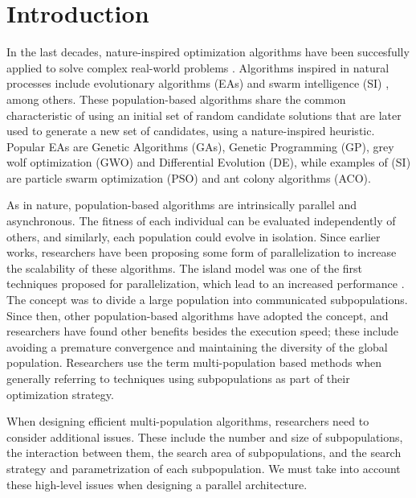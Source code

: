 \documentclass[review]{elsarticle}
\begin{document}
\linenumbers

\section{Introduction}

In the last decades, nature-inspired optimization algorithms have been succesfully
applied to solve complex real-world problems \cite{yang2014nature}. Algorithms
inspired in natural processes include evolutionary algorithms (EAs)
\cite{back1996evolutionary} and swarm intelligence (SI) \cite{kennedy2006swarm},
among others. These population-based algorithms share the common characteristic
of using an initial set of random candidate solutions that are later used to
generate a new set of candidates, using a nature-inspired heuristic. Popular EAs
are Genetic Algorithms (GAs), Genetic Programming (GP), grey wolf optimization
(GWO) and Differential Evolution (DE), while examples of (SI) are particle swarm
optimization (PSO) and ant colony algorithms (ACO).

As in nature, population-based algorithms are intrinsically parallel and
asynchronous. The fitness of each individual can be evaluated independently of
others, and similarly, each population could evolve in isolation. Since 
earlier works, researchers have been proposing some form of parallelization
\cite{muhlenbein1988evolution} to increase the scalability of these algorithms.
The island model was one of the first techniques proposed for parallelization,
which lead to an increased performance
\cite{gorges1990explicit,grosso1985computer}. The concept was to divide a large
population into communicated subpopulations. Since then, other population-based
algorithms have adopted the concept, and researchers have found other benefits
besides the execution speed; these include avoiding a premature convergence and
maintaining the diversity of the global population. Researchers use the term
multi-population based methods when generally referring to techniques using
subpopulations as part of their optimization strategy.

When designing efficient multi-population algorithms, researchers need to
consider additional issues. These include the number and size of subpopulations,
the interaction between them, the search area of subpopulations, and the search
strategy and parametrization of each subpopulation. We must take into account
these high-level issues when designing a parallel architecture. 
\end{document}
